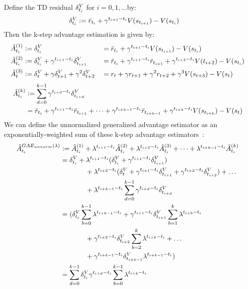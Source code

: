 Define the TD residual $\delta^V_{t_i}$ for $i=0,1, \dots$by:
\begin{align}
\delta^V_{t_i} & \vcentcolon=   \bar{r}_{t_i} + \gamma^{t_{i+1}-t_i} V(s_{t_{i+1}}) -V(s_{t_i})
\end{align}
Then the k-step advantage estimation is given by:
\begin{alignat}{2}
\hat{A}_{t_i}^{(1)} 
& \vcentcolon=   \delta^V_{{t_i}} 
 &&= \bar{r}_{t_i} + \gamma^{t_{i+1}-t_i} V(s_{t_{i+1}})-V(s_{t_i}) \\
\hat{A}_{t_i}^{(2)} 
&\vcentcolon= \delta^V_{t_i} + \gamma^{t_{i+1}-t_i} \delta^V_{t_{i+1}} 
&&= \bar{r}_{t_i} + \gamma^{t_{i+1}-t_i} \bar{r}_{t_{i+1}} + \gamma^{t_{i+2}-t_i} V(t_{i+2})-V(s_{t_i})  \\
\hat{A}_t^{(3)} 
&\vcentcolon= \delta^V_{t} + \gamma \delta^V_{t+1} + \gamma^2 \delta^V_{t+2} 
&&=  r_t + \gamma r_{t+1} + \gamma^2 r_{t+2} + \gamma^3 V(s_{t+3}) -V(s_t)  \label{a3}
\end{alignat}
\begin{align}
\begin{split}
\hat{A}_{t_i}^{(k)} 
&\vcentcolon= \sum_{d=0}^{k-1} 
\gamma^{t_{i+d}-t_i} \delta^V_{t_{i+d}} \\
&= \bar{r}_{t_i} + \gamma^{t_{i+1}-t_i} \bar{r}_{t_{i+1}} 
+ \dots 
+ \gamma^{t_{i+k-1}-t_i} \bar{r}_{t_{i+k-1}} 
+ \gamma^{t_{i+k}-t_i} V(s_{t_{i+k}})-V(s_t) 
\end{split}
\end{align}
We can define the unnormalized generalized advantage estimator as an exponentially-weighted sum of these k-step advantage estimators~\cite{schulman2015high}:
\begin{align}
\hat{A}_{t_i}^{GAE_{unnorm}(\lambda)}
&\vcentcolon=  \hat{A}_{t_i}^{(1)} + \lambda^{t_{i+1}-t_i}  \hat{A}_{t_i}^{(2)} + \lambda^{t_{i+2}-t_i} \hat{A}_{t_i}^{(3)} + \dots + \lambda^{t_{i+k-1}-t_i} \hat{A}_{t_i}^{(k)} \nonumber \\
&=  \delta^V_{t_i} 
+ \lambda^{t_{i+1}-t_i} (\delta^V_{t_i} + \gamma^{t_{i+1}-t_i} \delta^V_{t_{i+1}} ) \\
&\ \ \ \ \  \ \ \ \ \ \ +\lambda^{t_{i+2}-t_i} (\delta^V_t + \gamma^{t_{i+1}-t_i} \delta^V_{t_{i+1}} + \gamma^{t_{i+2}-t_i} \delta^V_{t_{i+2}}) + \dots \nonumber \\
&\ \ \ \ \  \ \ \ \ \ \ +\lambda^{t_{i+k-1}-t_i}  \sum_{d=0}^{k-1} \gamma^{t_{i+d}-t_i} \delta^V_{t_{i+d}}\\
&= (
\delta^V_{t_i}  \sum_{b=0}^{k-1} \lambda^{t_{i+k-1}-t_i}
+\gamma^{t_{i+1}-t_i} \delta^V_{t_{i+1}} \sum_{b=1}^k \lambda^{t_{i+b}-t_i} \nonumber \\
&\ \ \ \ \  \ \ \ \ \ \ +\gamma^{t_{i+2}-t_i} \delta^V_{t_{i+2}} \sum_{b=2}^k \lambda^{t_{i+b}-t_i}
+\dots \\
&\ \ \ \ \  \ \ \ \ \ \ +\gamma^{t_{i+k-1}-t_i} \delta^V_{t_{i+k-1}} \lambda^{t_{i+k-1}-t_i})
\nonumber \\
&= \sum_{d=0}^{k-1} \delta^V_{t_i} \gamma^{t_{i+d}-t_i} \sum_{b=0}^{k-1} \lambda^{t_{i+b}-t_i}
\label{eq:gaelam1}
\end{align}
